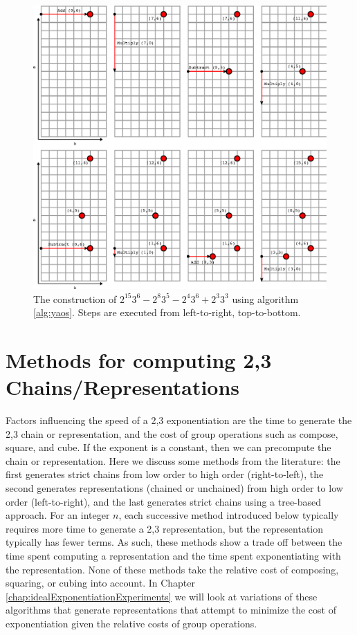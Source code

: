 \documentclass{ucalgthes1}
\theoremstyle{plain}
\theoremstyle{definition}
\begin{document}
\begin{figure}[H]
\centering
\includegraphics{yao1}
\caption{The construction of $2^{15} 3^6 - 2^8 3^5 - 2^4 3^6 + 2^3 3^3$ using algorithm \ref{alg:yaos}.  Steps are executed from left-to-right, top-to-bottom.}
\label{fig:yao1}
\end{figure}


\bigbreak
\section{Methods for computing 2,3 Chains/Representations}
\label{section:dbnsMethods}

Factors influencing the speed of a 2,3 exponentiation are the time to generate the 2,3 chain or representation, and the cost of group operations such as compose, square, and cube. If the exponent is a constant, then we can precompute the chain or representation. Here we discuss some methods from the literature: the first generates strict chains from low order to high order (right-to-left), the second generates representations (chained or unchained) from high order to low order (left-to-right), and the last generates strict chains using a tree-based approach.  For an integer $n$, each successive method introduced below typically requires more time to generate a 2,3 representation, but the representation typically has fewer terms.  As such, these methods show a trade off between the time spent computing a representation and the time spent exponentiating with the representation.  None of these methods take the relative cost of composing, squaring, or cubing into account.  In Chapter \ref{chap:idealExponentiationExperiments} we will look at variations of these algorithms that generate representations that attempt to minimize the cost of exponentiation given the relative costs of group operations.
\end{document}
